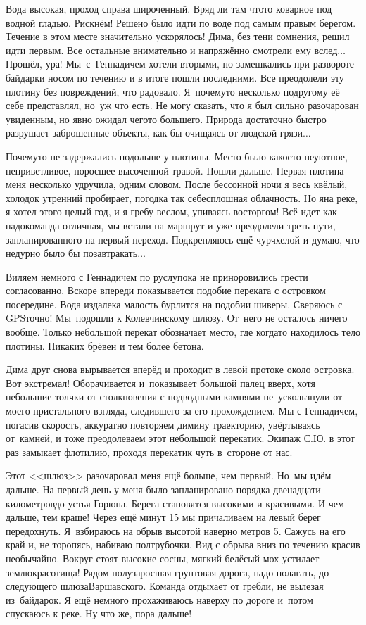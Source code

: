 Вода высокая, проход справа широченный. Вряд ли там что\sdash то коварное под водной гладью. Рискнём! Решено было идти по воде под самым правым берегом. Течение в этом месте значительно ускорялось! Дима, без тени сомнения, решил идти первым. Все остальные внимательно и напряжённо смотрели ему вслед$\ldots$ Прошёл, ура! Мы~с~Геннадичем хотели вторыми, но замешкались при развороте байдарки носом по течению и в итоге пошли последними. Все преодолели эту плотину без повреждений, что радовало. Я~почему\sdash то несколько по\sdash другому её себе представлял, но~уж что есть. Не могу сказать, что я был сильно разочарован увиденным, но явно ожидал чего\sdash то большего. Природа достаточно быстро разрушает заброшенные объекты, как бы очищаясь от людской грязи$\ldots$

Почему\sdash то не задержались подольше у плотины. Место было какое\sdash то неуютное, неприветливое, поросшее высоченной травой. Пошли дальше. Первая плотина меня несколько удручила, одним словом. После бессонной ночи я весь квёлый, холодок утренний пробирает, погодка так себе\mdash сплошная облачность. Но я\mdash на реке, я хотел этого целый год, и я гребу веслом, упиваясь восторгом! Всё идет как надо\mdash команда отличная, мы встали на маршрут и уже преодолели треть пути, запланированного на первый переход. Подкрепляюсь ещё чурчхелой и думаю, что недурно было бы позавтракать$\ldots$ 

Виляем немного с Геннадичем по руслу\mdash пока не приноровились грести согласованно. Вскоре впереди показывается подобие переката с островком посередине. Вода издалека малость бурлится на подобии шиверы. Сверяюсь с GPS\mdash точно! Мы~подошли к Колевчинскому шлюзу. От~него не осталось ничего вообще. Только небольшой перекат обозначает место, где когда\sdash то находилось тело плотины. Никаких брёвен и тем более бетона. 

Дима друг снова вырывается вперёд и проходит в левой протоке около островка. Вот экстремал! Оборачивается и~показывает большой палец вверх, хотя небольшие толчки от столкновения с подводными камнями не~ускользнули от моего пристального взгляда, следившего за его прохождением. Мы с Геннадичем, погасив скорость, аккуратно повторяем димину траекторию, увёртываясь от~камней, и тоже преодолеваем этот небольшой перекатик. Экипаж С.Ю. в этот раз замыкает флотилию, проходя перекатик чуть в~стороне от нас.

Этот <<шлюз>> разочаровал меня ещё больше, чем первый. Но~мы идём дальше. На первый день у меня было запланировано порядка двенадцати километров\mdash до устья Горюна. Берега становятся высокими и красивыми. И чем дальше, тем краше! Через ещё минут 15\thinspace\nbdash{} мы причаливаем на левый берег передохнуть. Я~взбираюсь на обрыв высотой наверно метров 5. Сажусь на его край и, не торопясь, набиваю полтрубочки. Вид с обрыва вниз по течению красив необычайно. Вокруг стоят высокие сосны, мягкий белёсый мох устилает землю\mdash красотища! Рядом полузаросшая грунтовая дорога, надо полагать, до следующего шлюза\mdash Варшавского. Команда отдыхает от гребли, не вылезая из~байдарок. Я ещё немного прохаживаюсь наверху по дороге и~потом спускаюсь к реке. Ну что же, пора дальше! 

